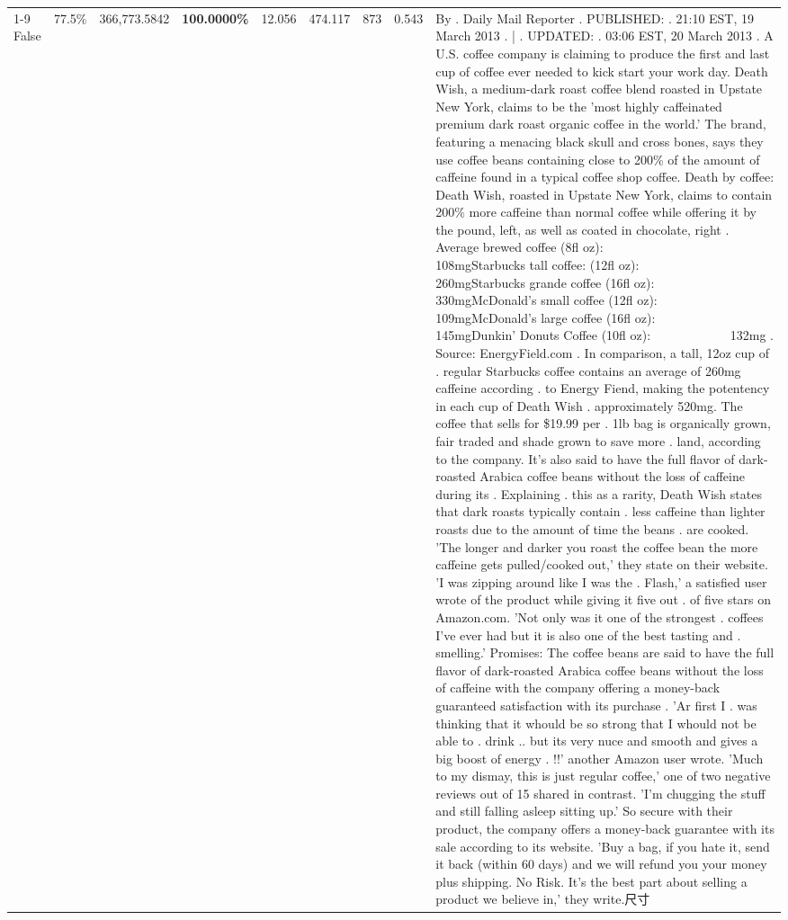 \begin{table}[H]
{\begin{tabular}{lllrlllll}
\cline{1-9}
False & 77.5\% & 366,773.5842 & \bfseries \color{red} 100.0000\% & 12.056 & 474.117 & 873 & 0.543 & By . Daily Mail Reporter . PUBLISHED: . 21:10 EST, 19 March 2013 . | . UPDATED: . 03:06 EST, 20 March 2013 . A U.S. coffee company is claiming to produce the first and last cup of coffee ever needed to kick start your work day. Death Wish, a medium-dark roast coffee blend roasted in Upstate New York, claims to be the 'most highly caffeinated premium dark roast organic coffee in the world.' The brand, featuring a menacing black skull and cross bones, says they use coffee beans containing close to 200\% of the amount of caffeine found in a typical coffee shop coffee. Death by coffee: Death Wish, roasted in Upstate New York, claims to contain 200\% more caffeine than normal coffee while offering it by the pound, left, as well as coated in chocolate, right . Average brewed coffee (8fl oz):              108mgStarbucks tall coffee: (12fl oz):                260mgStarbucks grande coffee (16fl oz):         330mgMcDonald's small coffee (12fl oz):           109mgMcDonald's large coffee (16fl oz):           145mgDunkin' Donuts Coffee (10fl oz):             132mg . Source: EnergyField.com . In comparison, a tall, 12oz cup of . regular Starbucks coffee contains an average of 260mg caffeine according . to Energy Fiend, making the potentency in each cup of Death Wish . approximately 520mg. The coffee that sells for \$19.99 per . 1lb bag is organically grown, fair traded and shade grown to save more . land, according to the company. It's also said to have the full flavor of dark-roasted Arabica coffee beans without the loss of caffeine during its . Explaining . this as a rarity, Death Wish states that dark roasts typically contain . less caffeine than lighter roasts due to the amount of time the beans . are cooked. 'The longer and darker you roast the coffee bean the more caffeine gets pulled/cooked out,' they state on their website. 'I was zipping around like I was the . Flash,' a satisfied user wrote of the product while giving it five out . of five stars on Amazon.com. 'Not only was it one of the strongest . coffees I've ever had but it is also one of the best tasting and . smelling.’ Promises: The coffee beans are said to have the full flavor of dark-roasted Arabica coffee beans without the loss of caffeine with the company offering a money-back guaranteed satisfaction with its purchase . 'Ar first I . was thinking that it whould be so strong that I whould not be able to . drink .. but its very nuce and smooth and gives a big boost of energy . !!' another Amazon user wrote. 'Much to my dismay, this is just regular coffee,' one of two negative reviews out of 15 shared in contrast. 'I'm chugging the stuff and still falling asleep sitting up.' So secure with their product, the company offers a money-back guarantee with its sale according to its website. 'Buy a bag, if you hate it, send it back (within 60 days) and we will refund you your money plus shipping. No Risk. It’s the best part about selling a product we believe in,' they write.尺寸 \\

\end{tabular}}
\end{table}
